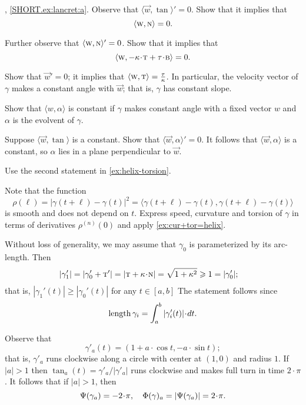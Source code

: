\parbf{\ref{ex:lancret}}, \ref{SHORT.ex:lancret:a}.
Observe that 
$\langle \vec w,\tan\rangle'=0$.
Show that it implies that
\[\langle \textsc w, \textsc{n}\rangle =0.\]

Further observe that 
$\langle \textsc w,\textsc{n}\rangle'=0$.
Show that it implies that 
\[\langle \vec w, -\kur\cdot\tan+\tor\cdot \bi\rangle =0.\]

Show that $\vec w'=0$;
it implies that $\langle \textsc w,\textsc{t}\rangle=\tfrac{\tau}{\kappa}$.
In particular, the velocity vector of $\gamma$ makes a constant angle with $\vec w$; that is, $\gamma$ has constant slope.

Show that $\langle w,\alpha\rangle$ is constant if $\gamma$ makes constant angle with a fixed vector $w$ and $\alpha$ is the evolvent of $\gamma$.

Suppose $\langle \vec w,\tan\rangle$ is a constant.
Show that $\langle \vec w,\alpha\rangle'=0$.
It follows that $\langle \vec w,\alpha\rangle$ is a constant,
so $\alpha$ lies in a plane perpendicular to $\vec w$.


 Use the second statement in \ref{ex:helix-torsion}.

 Note that the function
\[\rho(\ell)=|\gamma(t+\ell)-\gamma(t)|^2=\langle \gamma(t+\ell)-\gamma(t),\gamma(t+\ell)-\gamma(t)\rangle\] 
is smooth and does not depend on $t$.
Express speed, curvature and torsion of $\gamma$ in terms of derivatives $\rho^{(n)}(0)$
and apply \ref{ex:cur+tor=helix}.

Without loss of generality, we may assume that $\gamma_0$ is parameterized by its arc-length.
Then
\begin{align*}
|\gamma_1'|&=|\gamma_0'+\tan'|=|\tan+\kur\cdot\norm|=
\sqrt{1+\kur^2}\ge
1=
|\gamma_0'|;
\end{align*}
that is, $|\gamma_1'(t)|\ge|\gamma_0'(t)|$ for any $t\in[a,b]$
The statement follows since 
\[\length\gamma_i
=
\int_a^b|\gamma_i'(t)|\cdot dt.\]

Observe that
\[\gamma'_a(t)=(1+a\cdot \cos t, -a\cdot \sin t);\]
that is, $\gamma'_a$ runs clockwise along a circle with center at $(1,0)$ and radius $1$.
If $|a|>1$ then $\tan_a(t)=\gamma'_a/|\gamma'_a|$ runs clockwise and makes full turn in time $2\cdot\pi$.
It follows that if $|a|>1$, then
\[\Psi(\gamma_a)=-2\cdot\pi,\quad \tc\gamma_a=|\Psi(\gamma_a)|=2\cdot\pi.\]

